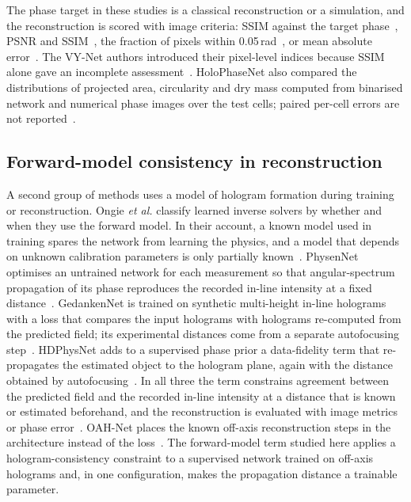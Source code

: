 \documentclass[11pt]{article}
\begin{document}
The phase target in these studies is a classical reconstruction or a
simulation, and the reconstruction is scored with image criteria: SSIM against
the target
phase~\cite{di2021phasenet,zhao2023vynet,park2021unwrapgan,svistunov2026holocel},
PSNR and SSIM~\cite{park2026simple}, the fraction of pixels within
0.05\,rad~\cite{zhao2023vynet}, or mean absolute
error~\cite{delikoyun2025rthad}. The VY-Net authors introduced their
pixel-level indices because SSIM alone gave an incomplete
assessment~\cite{zhao2023vynet}. HoloPhaseNet also compared the distributions
of projected area, circularity and dry mass computed from binarised network and
numerical phase images over the test cells; paired per-cell errors are not
reported~\cite{jaferzadeh2022holophasenet}.

\subsection{Forward-model consistency in reconstruction}
\label{sec:rw-fwd}

A second group of methods uses a model of hologram formation during training or
reconstruction. Ongie \emph{et al.} classify learned inverse solvers by whether
and when they use the forward model. In their account, a known model used in
training spares the network from learning the physics, and a model that depends
on unknown calibration parameters is only partially known~\cite{ongie2020deep}.
PhysenNet optimises an untrained network for each measurement so that
angular-spectrum propagation of its phase reproduces the recorded in-line
intensity at a fixed distance~\cite{wang2020physennet}. GedankenNet is trained
on synthetic multi-height in-line holograms with a loss that compares the input
holograms with holograms re-computed from the predicted field; its
experimental distances come from a separate autofocusing
step~\cite{huang2023gedankennet}. HDPhysNet adds to a supervised phase prior a
data-fidelity term that re-propagates the estimated object to the hologram
plane, again with the distance obtained by
autofocusing~\cite{galande2024hdphysnet}. In all three the term constrains
agreement between the predicted field and the recorded in-line intensity at a
distance that is known or estimated beforehand, and the reconstruction is
evaluated with image metrics or phase
error~\cite{wang2020physennet,huang2023gedankennet,galande2024hdphysnet}.
OAH-Net places the known off-axis reconstruction steps in the architecture
instead of the loss~\cite{delikoyun2025rthad}. The forward-model term studied
here applies a hologram-consistency constraint to a supervised network trained
on off-axis holograms and, in one configuration, makes the propagation distance
a trainable parameter.
\end{document}
